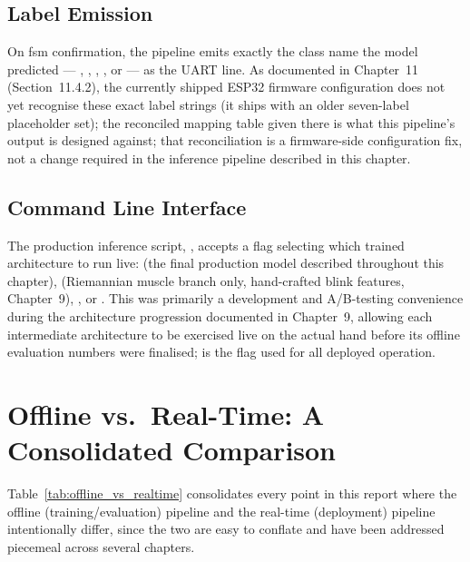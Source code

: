 \subsection{Label Emission}

On \acrshort{fsm} confirmation, the pipeline emits exactly the
class name the model predicted --- ,
, , , or
 --- as the UART line. As documented in
Chapter~11 (Section~11.4.2), the currently shipped ESP32 firmware
configuration does not yet recognise these exact label strings
(it ships with an older seven-label placeholder set); the
reconciled mapping table given there is what this pipeline's output
is designed against; that reconciliation is a firmware-side
configuration fix, not a change required in the inference pipeline
described in this chapter.

\subsection{Command Line Interface}

The production inference script, , accepts a
 flag selecting which trained architecture to run
live:  (the final production model described throughout
this chapter),  (Riemannian muscle branch only, hand-crafted
blink features, Chapter~9), , or . This
was primarily a development and A/B-testing convenience during the
architecture progression documented in Chapter~9, allowing each
intermediate architecture to be exercised live on the actual hand
before its offline evaluation numbers were finalised;  is
the flag used for all deployed operation.

\section{Offline vs.\ Real-Time: A Consolidated Comparison}
\label{sec:inf_compare}

Table~\ref{tab:offline_vs_realtime} consolidates every point in this
report where the offline (training/evaluation) pipeline and the
real-time (deployment) pipeline intentionally differ, since the two
are easy to conflate and have been addressed piecemeal across
several chapters.


